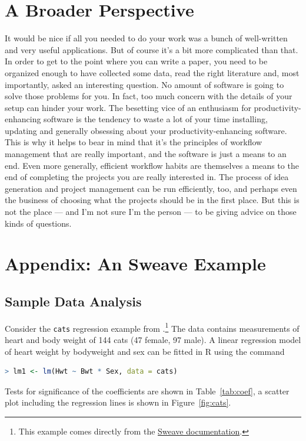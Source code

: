 \documentclass[11pt,article,oneside]{memoir}
\begin{document}
\chapter{A Broader Perspective} 
It would be nice if all you needed to do your work was a bunch of well-written and very useful applications. But of course it's a bit more complicated than that. In order to get to the point where you can write a paper, you need to be organized enough to have collected some data, read the right literature and, most importantly, asked an interesting question. No amount of software is going to solve those problems for you. In fact, too much concern with the details of your setup can hinder your work. The besetting vice of an enthusiasm for productivity-enhancing software is the tendency to waste a lot of your time installing, updating and generally obsessing about your productivity-enhancing software. This is why it helps to bear in mind that it's the principles of workflow management that are really important, and the software is just a means to an end. Even more generally, efficient workflow habits are themselves a means to the end of completing the projects you are really interested in. The process of idea generation and project management can be run efficiently, too, and perhaps even the business of choosing what the projects should be in the first place. But this is not the place --- and I'm not sure I'm the person --- to be giving advice on those kinds of questions.

\appendix

\chapter*{Appendix: An Sweave Example} %
\label{sec:an_sweave_example}
 
\section*{Sample Data Analysis} %
\label{sec:sample_data_analysis}
Consider the \texttt{cats} regression example from
\citet{venables02:_moder_applied_statis_s_plus}.\footnote{This example comes
  directly from the \href{http://www.ci.tuwien.ac.at/~leisch/Sweave/}{Sweave documentation}.} The data contains 
measurements of heart and body weight of 144 cats (47 female, 97 male). A
linear regression model of heart weight by bodyweight and sex can be fitted in
R using the command

\begin{lstlisting}[language=R,numbers=none]
> lm1 <- lm(Hwt ~ Bwt * Sex, data = cats)
\end{lstlisting}
\normalsize 
Tests for significance of the coefficients are shown in
Table~\ref{tab:coef}, a scatter plot including the regression lines is
shown in Figure~\ref{fig:cats}.
\end{document}
